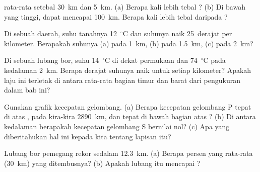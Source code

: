 \begin{exercise}[$\star\star$]\label{exo:g6:inside-the-earth:6}
  rata-rata setebal 30~km dan   5~km. (a) Berapa kali
lebih tebal  ? (b) Di bawah  yang tinggi,  dapat
mencapai 100~km. Berapa kali lebih tebal daripada  ?
\end{exercise}

\begin{exercise}[$\star\star$]\label{exo:g6:inside-the-earth:7}
Di sebuah daerah, suhu tanahnya 12~$^\circ$C dan suhunya naik 25~derajat
per kilometer. Berapakah suhunya (a) pada 1~km, (b) pada 1.5~km, (c) pada
2~km?
\end{exercise}

\begin{exercise}[$\star\star$]\label{exo:g6:inside-the-earth:8}
Di sebuah lubang bor, suhu  14~$^\circ$C di dekat permukaan dan
74~$^\circ$C pada kedalaman 2~km. Berapa derajat suhunya naik untuk setiap
kilometer? Apakah laju ini terletak di antara rata-rata bagian timur dan
barat dari pengukuran dalam bab ini?
\end{exercise}

\begin{exercise}[$\star\star$]\label{exo:g6:inside-the-earth:9}
Gunakan grafik kecepatan gelombang. (a) Berapa kecepatan gelombang P tepat
di atas , pada kira-kira 2890~km, dan tepat di bawah bagian atas ?
(b) Di antara kedalaman berapakah kecepatan gelombang S bernilai nol?
(c) Apa yang diberitahukan hal ini kepada kita tentang lapisan itu?
\end{exercise}

\begin{exercise}[$\star\star$]\label{exo:g6:inside-the-earth:10}
Lubang bor pemegang rekor sedalam 12.3~km. (a) Berapa persen  
yang rata-rata (30~km) yang ditembusnya? (b) Apakah lubang itu mencapai
?
\end{exercise}

